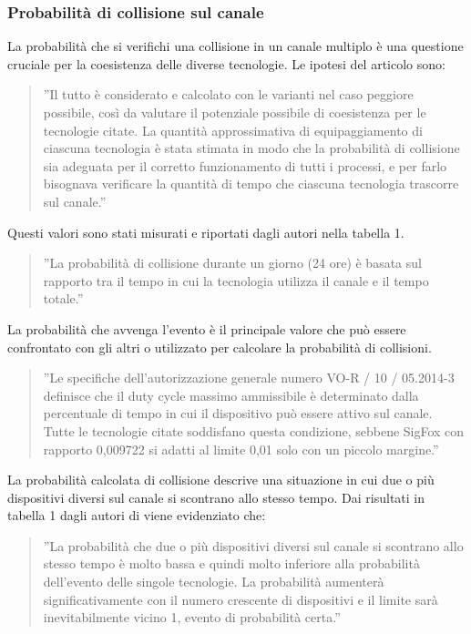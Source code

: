\documentclass[a4paper]{report} %
\begin{document}
\subsubsection{Probabilità di collisione sul canale}
La probabilità che si verifichi una collisione in un canale multiplo è una questione cruciale per la coesistenza delle diverse tecnologie. Le ipotesi del articolo \cite{art:rif.46} sono:
\begin{quote}
	''Il tutto è considerato e calcolato con le varianti nel caso peggiore possibile, così da valutare il potenziale possibile di coesistenza per le tecnologie citate. La quantità approssimativa di equipaggiamento di ciascuna tecnologia è stata stimata in modo che la probabilità di collisione sia adeguata per il corretto funzionamento di tutti i processi, e per farlo bisognava verificare la quantità di tempo che ciascuna tecnologia trascorre sul canale.''
\end{quote}
 Questi valori sono stati misurati e riportati dagli autori nella tabella 1. 
 \begin{quote}
 	''La probabilità di collisione durante un giorno (24 ore) è basata sul rapporto tra il tempo in cui la tecnologia utilizza il canale e il tempo totale.''
 \end{quote}
 La probabilità che avvenga l'evento è il principale valore che può essere confrontato con gli altri o utilizzato per calcolare la probabilità di collisioni. 
 \begin{quote}
 	''Le specifiche dell'autorizzazione generale numero VO-R / 10 / 05.2014-3  definisce che il duty cycle massimo ammissibile è determinato dalla percentuale di tempo in cui il dispositivo può essere attivo sul canale. Tutte le tecnologie citate soddisfano questa condizione, sebbene SigFox con rapporto 0,009722 si adatti al limite 0,01 solo con un piccolo margine.''
 \end{quote}
 La probabilità calcolata di collisione descrive una situazione in cui due o più dispositivi diversi sul canale si scontrano allo stesso tempo. Dai risultati in tabella 1 dagli autori di \cite{art:rif.46} viene evidenziato che: 
 \begin{quote}
 	''La probabilità che due o più dispositivi diversi sul canale si scontrano allo stesso tempo è molto bassa e quindi molto inferiore alla probabilità dell'evento delle singole tecnologie. La probabilità aumenterà significativamente con il numero crescente di dispositivi e il limite sarà inevitabilmente vicino 1, evento di probabilità certa.''
 \end{quote}
\end{document}

